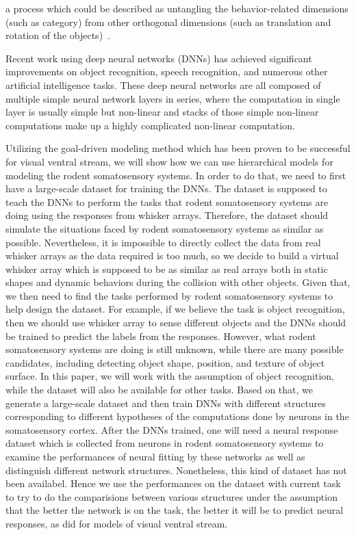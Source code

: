 a process which could be described as untangling the behavior-related dimensions (such as category) from other orthogonal dimensions (such as translation and rotation of the objects)~\cite{yamins2016using}.

Recent work using deep neural networks (DNNs) has achieved significant improvements on object recognition, speech recognition, and numerous other artificial intelligence tasks\cite{Krizhevsky, hinton2012deep, lecun2015deep}.
These deep neural networks are all composed of multiple simple neural network layers in series, where the computation in single layer is usually simple but non-linear and stacks of those simple non-linear computations make up a highly complicated non-linear computation.



Utilizing the goal-driven modeling method which has been proven to be successful for visual ventral stream, we will show how we can use hierarchical models for modeling the rodent somatosensory systems.
In order to do that, we need to first have a large-scale dataset for training the DNNs.
The dataset is supposed to teach the DNNs to perform the tasks that rodent somatosensory systems are doing using the responses from whisker arrays.
Therefore, the dataset should simulate the situations faced by rodent somatosensory systems as similar as possible. 
Nevertheless, it is impossible to directly collect the data from real whisker arrays as the data required is too much, so we decide to build a virtual whisker array which is supposed to be as similar as real arrays both in static shapes and dynamic behaviors during the collision with other objects.
Given that, we then need to find the tasks performed by rodent somatosensory systems to help design the dataset. 
For example, if we believe the task is object recognition, then we should use whisker array to sense different objects and the DNNs should be trained to predict the labels from the responses.
However, what rodent somatosensory systems are doing is still unknown, while there are many possible candidates, including detecting object shape, position, and texture of object surface\cite{Boubenec2012,Diamond2008,Arabzadeh2005,OConnor2010}.
In this paper, we will work with the assumption of object recognition, while the dataset will also be available for other tasks. 
Based on that, we generate a large-scale dataset and then train DNNs with different structures corresponding to different hypotheses of the computations done by neurons in the somatosensory cortex.
After the DNNs trained, one will need a neural response dataset which is collected from neurons in rodent somatosensory systems to examine the performances of neural fitting by these networks as well as distinguish different network structures.
Nonetheless, this kind of dataset has not been availabel. Hence we use the performances on the dataset with current task to try to do the comparisions between various structures under the assumption that the better the network is on the task, the better it will be to predict neural responses, as did for models of visual ventral stream.

